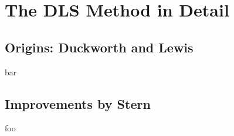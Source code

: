 \chapter{The DLS Method in Detail}

\section{Origins: Duckworth and Lewis}
bar

\section{Improvements by Stern}
foo